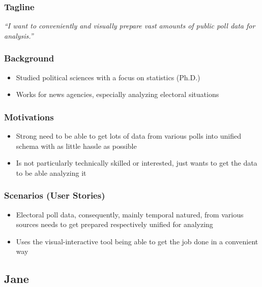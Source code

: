 \subsubsection{Tagline}

\textit{``I want to conveniently and visually prepare vast amounts of public poll data for analysis.''}

\subsubsection{Background}

\begin{itemize}
    \item Studied political sciences with a focus on statistics (Ph.D.)
    \item Works for news agencies, especially analyzing electoral situations
\end{itemize}

\subsubsection{Motivations}

\begin{itemize}
    \item Strong need to be able to get lots of data from various polls into unified schema with as little hassle as possible
    \item Is not particularly technically skilled or interested, just wants to get the data to be able analyzing it
\end{itemize}

\subsubsection{Scenarios (User Stories)}

\begin{itemize}
    \item Electoral poll data, consequently, mainly temporal natured, from various sources needs to get prepared respectively unified for analyzing
    \item Uses the visual-interactive tool being able to get the job done in a convenient way
\end{itemize}


\subsection{Jane}

